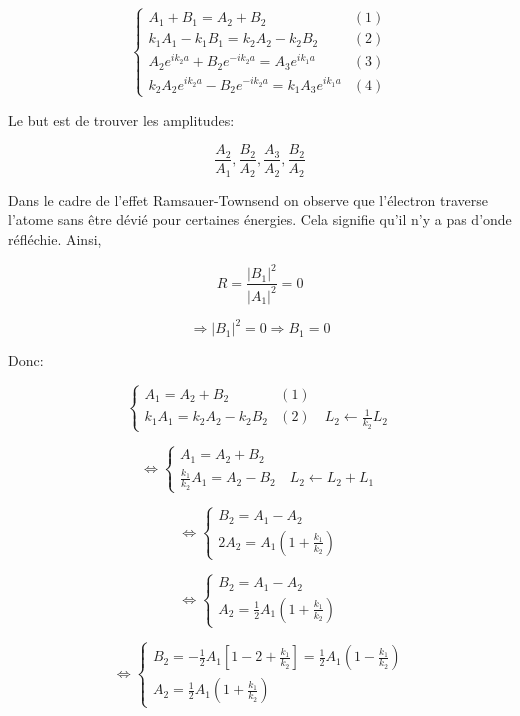 \documentclass[12pt,a4paper]{article}
\begin{document}
\begin{equation*}
\begin{cases}
A_1 + B_1 = A_2 + B_2 & (1) \\
k_1A_1 - k_1B_1 = k_2A_2 - k_2B_2 & (2) \\
A_2e^{ik_2a} + B_2e^{-ik_2a} = A_3e^{ik_1a} & (3) \\
k_2A_2e^{ik_2a} - B_2e^{-ik_2a} = k_1A_3e^{ik_1a} & (4)
\end{cases}
\end{equation*}

Le but est de trouver les amplitudes:

\[ \frac{A_2}{A_1}, \frac{B_2}{A_2}, \frac{A_3}{A_2}, \frac{B_2}{A_2} \]

Dans le cadre de l'effet Ramsauer-Townsend on observe que l'électron traverse l'atome sans être dévié pour certaines énergies. Cela signifie qu'il n'y a pas d'onde réfléchie. Ainsi, 

\[ R = \frac{|B_1|^2}{|A_1|^2} = 0 \]

\[ \Rightarrow |B_1|^2 = 0 \Rightarrow B_1 = 0 \]

Donc:

\[\begin{cases}
A_1 = A_2 + B_2 & (1) \\
k_1 A_1 = k_2 A_2 - k_2 B_2 & (2) \quad L_2 \leftarrow \frac{1}{k_2}L_2
\end{cases} \]

\[ \Leftrightarrow \begin{cases}
A_1 = A_2 + B_2 \\
\frac{k_1}{k_2} A_1 = A_2 - B_2 \quad L_2 \leftarrow L_2 + L_1
\end{cases} \]

\[ \Leftrightarrow \begin{cases}
B_2 = A_1 - A_2 \\
2A_2 = A_1(1 + \frac{k_1}{k_2})
\end{cases}\]

\[\Leftrightarrow \begin{cases}
B_2 = A_1 - A_2 \\
A_2 = \frac{1}{2}A_1(1 + \frac{k_1}{k_2})
\end{cases} \]

\[ \Leftrightarrow \begin{cases}
B_2 = -\frac{1}{2}A_1\left[1-2+\frac{k_1}{k_2}\right] = \frac{1}{2}A_1\left(1-\frac{k_1}{k_2}\right) \\
A_2 = \frac{1}{2}A_1\left(1+\frac{k_1}{k_2}\right)
\end{cases} \]
\end{document}
